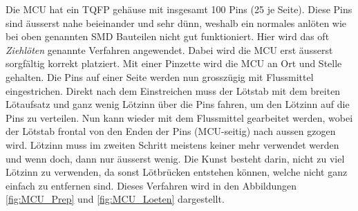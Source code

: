 Die MCU hat ein TQFP gehäuse mit insgesamt 100 Pins (25 je Seite). Diese Pins sind äusserst nahe beieinander und sehr dünn, weshalb ein normales anlöten wie bei oben genannten SMD Bauteilen nicht gut funktioniert. Hier wird das oft \textit{Ziehlöten} genannte Verfahren angewendet. Dabei wird die MCU erst äusserst sorgfältig korrekt platziert. Mit einer Pinzette wird die MCU an Ort und Stelle gehalten. Die Pins auf einer Seite werden nun grosszügig mit Flussmittel eingestrichen. Direkt nach dem Einstreichen muss der Lötstab mit dem breiten Lötaufsatz und ganz wenig Lötzinn über die Pins fahren, um den Lötzinn auf die Pins zu verteilen. Nun kann wieder mit dem Flussmittel gearbeitet werden, wobei der Lötstab frontal von den Enden der Pins (MCU-seitig) nach aussen gzogen wird. Lötzinn muss im zweiten Schritt meistens keiner mehr verwendet werden und wenn doch, dann nur äusserst wenig. Die Kunst besteht darin, nicht zu viel Lötzinn zu verwenden, da sonst Lötbrücken entstehen können, welche nicht ganz einfach zu entfernen sind. Dieses Verfahren wird in den Abbildungen \ref{fig:MCU_Prep} und \ref{fig:MCU_Loeten} dargestellt.\\

